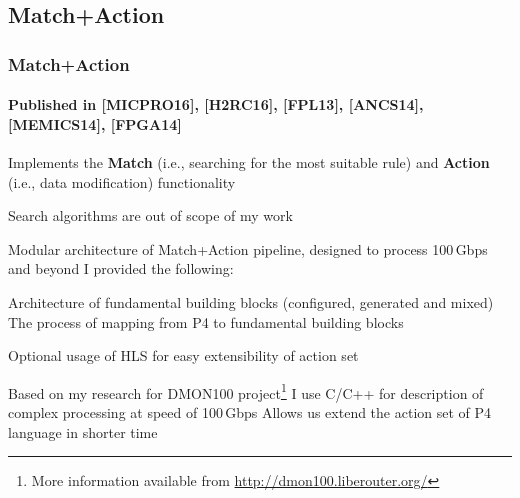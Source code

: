 %    

\subsection*{Match+Action}
\begin{frame}
    \frametitle{Match+Action}
    \framesubtitle{Published in [MICPRO16], [H2RC16], [FPL13], [ANCS14], [MEMICS14], [FPGA14]}
    
    \begin{itemize}
        \fitem Implements the \textbf{Match} (i.e., searching for the most suitable rule) and \textbf{Action} (i.e., data modification) functionality
        \begin{itemize}
            \fitem Search algorithms are out of scope of my work
        \end{itemize}
        \fitem Modular architecture of Match+Action pipeline, designed to process 100\,Gbps and beyond
        \fitem I provided the following:
        \begin{itemize}
            \fitem Architecture of fundamental building blocks (configured, generated and mixed)
            \fitem The process of mapping from P4 to fundamental building blocks
        \end{itemize}
        \fitem Optional usage of HLS for easy extensibility of action set
        \begin{itemize}
            \fitem Based on my research for DMON100 project\footnote{More information available from \url{http://dmon100.liberouter.org/}}
            \fitem I use C/C++ for description of complex processing at speed of 100\,Gbps
            \fitem Allows us extend the action set of P4 language in shorter time
        \end{itemize}
    \end{itemize}
\end{frame}

